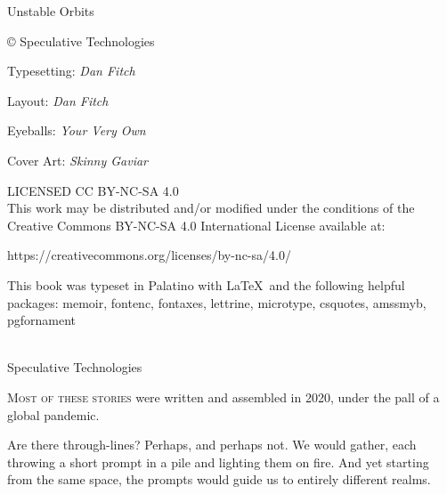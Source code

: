 



\pagestyle{empty}

\mainmatter
\raggedbottom

{
\null\vfill

\begin{flushleft}

{\small

{\variexfont{}Unstable Orbits}

© {\tubefont{}Speculative Technologies}

\bigskip

Typesetting: \emph{Dan Fitch}

Layout: \emph{Dan Fitch}

Eyeballs: \emph{Your Very Own}

Cover Art: \emph{Skinny Gaviar}

\bigskip

LICENSED CC BY-NC-SA 4.0 \\
This work may be distributed and/or modified under the conditions of the Creative Commons BY-NC-SA 4.0 International License available at:
\begin{monotype}
https://creativecommons.org/licenses/by-nc-sa/4.0/
\end{monotype}

This book was typeset in Palatino with \LaTeX\ and the following helpful packages:
  memoir,
  fontenc,
  fontaxes,
  lettrine,
  microtype,
  csquotes,
  amssmyb,
  pgfornament
\bigskip
}
\end{flushleft}
}

\clearpage
\pagestyle{plain}

\begingroup%
\centering
\vspace*{24pt}
{\HUGE {}}\\[\baselineskip]
{\Huge \tubefont Speculative Technologies}\\[\baselineskip]
\vfill\null
\endgroup



{\setlength{\beforechapskip}{0pt}
\begin{KeepFromToc}
  \tableofcontents*
\end{KeepFromToc}
}

\vfill
\specsep{}

\lettrine{M}{ost of these stories} were written and assembled in 2020, under the pall of a global pandemic.

Are there through-lines? Perhaps, and perhaps not. We would gather, each throwing a short prompt in a pile and lighting them on fire. And yet starting from the same space, the prompts would guide us to entirely different realms.

